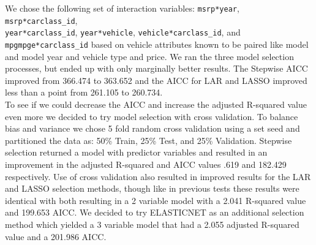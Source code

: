 \documentclass[acmsmall]{acmart}
\begin{document}
We chose the following set of interaction variables: \texttt{msrp*year}, \texttt{msrp*carclass\_id}, \\
\texttt{year*carclass\_id}, \texttt{year*vehicle}, \texttt{vehicle*carclass\_id}, and \texttt{mpgmpge*carclass\_id} based on vehicle attributes known to be paired like model and model year and vehicle type and price. We ran the three model selection processes, but ended up with only marginally better results. The Stepwise AICC improved from 366.474 to 363.652 and the AICC for LAR and LASSO improved less than a point from 261.105 to 260.734.\\

To see if we could decrease the AICC and increase the adjusted R-squared value even more we decided to try model selection with cross validation. To balance bias and variance we chose 5 fold random cross validation using a set seed and partitioned the data as: 50\% Train, 25\% Test, and 25\% Validation. Stepwise selection returned a model with predictor variables and resulted in an improvement in the adjusted R-squared and AICC values .619 and 182.429 respectively. Use of cross validation also resulted in improved results for the LAR and LASSO selection methods, though like in previous tests these results were identical with both resulting in a 2 variable model with a 2.041 R-squared value and 199.653 AICC. We decided to try ELASTICNET as an additional selection method which yielded a 3 variable model that had a 2.055 adjusted R-squared value and a 201.986 AICC.\\
\end{document}
